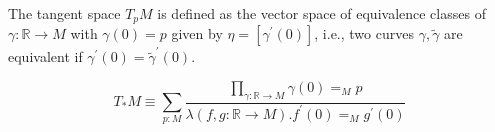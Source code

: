 \documentclass{letter}
\begin{document}
The tangent space $T_p M$ is defined as the vector space of equivalence classes
of $\gamma : \mathbb{R} \to M$ with $\gamma(0) = p$ 
given by $\eta = [\gamma^\prime(0)]$, i.e., two curves 
$\gamma, \tilde{\gamma}$ are equivalent if 
$\gamma^\prime(0) = \tilde{\gamma}^\prime(0)$.

$$
T_{*}M \equiv 
  \sum_{p : M} 
    \frac{\prod_{\gamma : \mathbb{R} \to M} \gamma(0) =_M p}
         {\lambda (f, g : \mathbb{R} \to M) .  f^\prime(0) =_M g^\prime(0)}
$$
\end{document}
